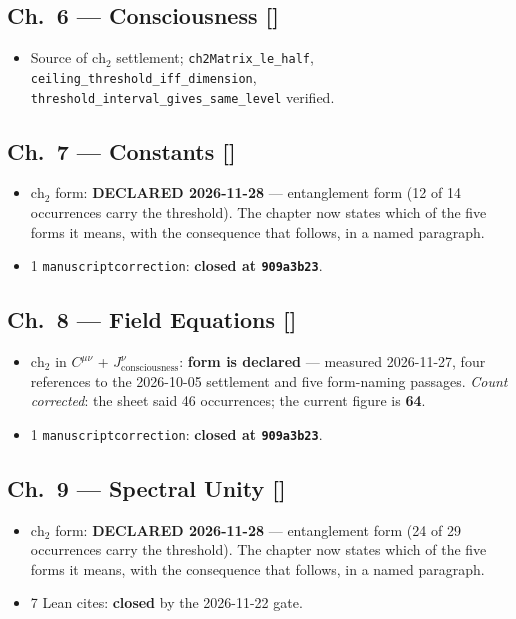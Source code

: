 \subsection*{Ch.~6 --- Consciousness \hfill [\checkmark]}
\begin{itemize}
\item Source of $\mathrm{ch}_2$ settlement; \texttt{ch2Matrix\_le\_half}, \texttt{ceiling\_threshold\_iff\_dimension}, \texttt{threshold\_interval\_gives\_same\_level} verified.
\end{itemize}

\subsection*{Ch.~7 --- Constants \hfill [\checkmark]}
\begin{itemize}
\item $\mathrm{ch}_2$ form: \textbf{DECLARED 2026-11-28} --- entanglement form (12 of 14 occurrences carry the threshold). The chapter now states which of the five forms it means, with the consequence that follows, in a named paragraph.
\item 1 \texttt{manuscriptcorrection}: \textbf{closed at \texttt{909a3b23}}.
\end{itemize}

\subsection*{Ch.~8 --- Field Equations \hfill [\checkmark]}
\begin{itemize}
\item $\mathrm{ch}_2$ in $C^{\mu\nu}$ + $J^\nu_{\text{consciousness}}$:
\textbf{form is declared} --- measured 2026-11-27, four references to the
2026-10-05 settlement and five form-naming passages. \emph{Count corrected}:
the sheet said 46 occurrences; the current figure is \textbf{64}.
\item 1 \texttt{manuscriptcorrection}: \textbf{closed at \texttt{909a3b23}}.
\end{itemize}

\subsection*{Ch.~9 --- Spectral Unity \hfill [\checkmark]}
\begin{itemize}
\item $\mathrm{ch}_2$ form: \textbf{DECLARED 2026-11-28} --- entanglement form (24 of 29 occurrences carry the threshold). The chapter now states which of the five forms it means, with the consequence that follows, in a named paragraph.
\item 7 Lean cites: \textbf{closed} by the 2026-11-22 gate.
\end{itemize}

